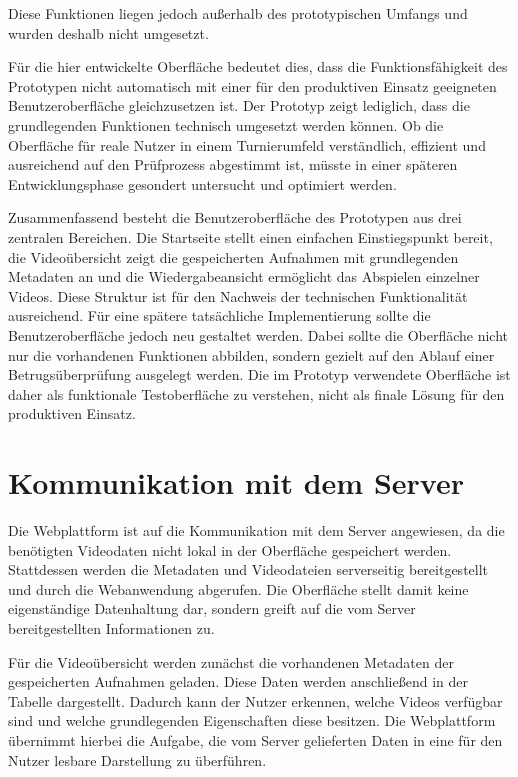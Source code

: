 Diese Funktionen liegen jedoch außerhalb des prototypischen Umfangs und wurden deshalb nicht umgesetzt. 

Für die hier entwickelte Oberfläche bedeutet dies, dass die Funktionsfähigkeit des Prototypen nicht automatisch mit einer für den produktiven Einsatz geeigneten Benutzeroberfläche gleichzusetzen ist. Der Prototyp zeigt lediglich, dass die grundlegenden Funktionen technisch umgesetzt werden können. 
Ob die Oberfläche für reale Nutzer in einem Turnierumfeld verständlich, effizient und ausreichend auf den Prüfprozess abgestimmt ist, müsste in einer späteren Entwicklungsphase gesondert untersucht und optimiert werden.

Zusammenfassend besteht die Benutzeroberfläche des Prototypen aus drei zentralen Bereichen. Die Startseite stellt einen einfachen Einstiegspunkt bereit, die Videoübersicht zeigt die gespeicherten Aufnahmen mit grundlegenden Metadaten an und die Wiedergabeansicht ermöglicht das Abspielen einzelner Videos. 
Diese Struktur ist für den Nachweis der technischen Funktionalität ausreichend. Für eine spätere tatsächliche Implementierung sollte die Benutzeroberfläche jedoch neu gestaltet werden. Dabei sollte die Oberfläche nicht nur die vorhandenen Funktionen abbilden, 
sondern gezielt auf den Ablauf einer Betrugsüberprüfung ausgelegt werden. Die im Prototyp verwendete Oberfläche ist daher als funktionale Testoberfläche zu verstehen, nicht als finale Lösung für den produktiven Einsatz. 

\section{Kommunikation mit dem Server} \label{sec:web-kommunikation} 

Die Webplattform ist auf die Kommunikation mit dem Server angewiesen, da die benötigten Videodaten nicht lokal in der Oberfläche gespeichert werden. Stattdessen werden die Metadaten und Videodateien serverseitig bereitgestellt und durch die Webanwendung abgerufen. 
Die Oberfläche stellt damit keine eigenständige Datenhaltung dar, sondern greift auf die vom Server bereitgestellten Informationen zu. 

Für die Videoübersicht werden zunächst die vorhandenen Metadaten der gespeicherten Aufnahmen geladen. Diese Daten werden anschließend in der Tabelle dargestellt. Dadurch kann der Nutzer erkennen, welche Videos verfügbar sind und welche grundlegenden Eigenschaften diese besitzen. 
Die Webplattform übernimmt hierbei die Aufgabe, die vom Server gelieferten Daten in eine für den Nutzer lesbare Darstellung zu überführen. 

